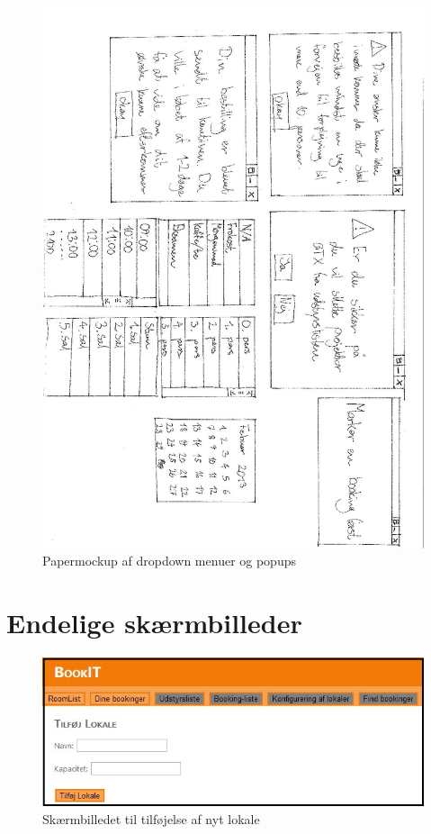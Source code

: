\begin{figure}[h!]
  \centering
    \includegraphics[angle=180, width=\textwidth]{Appendix/GUI-Prototype/PaperMockup/PopUpDropDowns_002}
  \caption{Papermockup  af dropdown menuer og popups}
\label{App_GUI_paper_PopUpDropDowns}
\end{figure}

\clearpage
\section{Endelige skærmbilleder}
\label{App_GUI_final}

\begin{figure}[h!]
  \centering
    \includegraphics[angle=90, height=0.8\textheight]{Appendix/GUI-Prototype/DigitalMockup/AddRoom}
  \caption{Skærmbilledet til tilføjelse af nyt lokale}
\label{App_GUI_final_AddRoom}
\end{figure}

